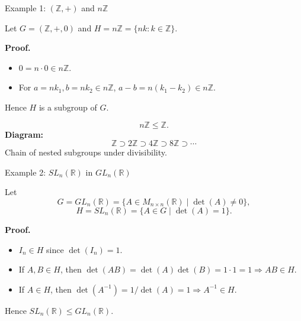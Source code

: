 \begin{frame}{Example 1: $(\mathbb{Z}, +)$ and $n\mathbb{Z}$}
\begin{block}{}
    Let \(G=(\mathbb{Z}, +, 0)\) and \(H = n\mathbb{Z} = \{nk : k\in \mathbb{Z}\}.\)

\textbf{Proof.}
\begin{itemize}
  \item \(0 = n\cdot 0 \in n\mathbb{Z}\).
  \item For \(a=nk_1, b=nk_2 \in n\mathbb{Z}\), \(a-b = n(k_1-k_2)\in n\mathbb{Z}\).
\end{itemize}
Hence \(H\) is a subgroup of \(G.\)

\[
n\mathbb{Z} \le \mathbb{Z}.
\]
\textbf{Diagram:}
\[
\mathbb{Z} \supset 2\mathbb{Z} \supset 4\mathbb{Z} \supset 8\mathbb{Z} \supset \cdots
\]
Chain of nested subgroups under divisibility.
\end{block}

\end{frame}

\begin{frame}{Example 2: $SL_n(\mathbb{R})$ in $GL_n(\mathbb{R})$}
\begin{block}{}
Let
\[
G = GL_n(\mathbb{R}) = \{A\in M_{n\times n}(\mathbb{R}) \mid \det(A)\ne 0\},
\]
\[
H = SL_n(\mathbb{R}) = \{A\in G \mid \det(A)=1\}.
\]

\textbf{Proof.}
\begin{itemize}
  \item \(I_n \in H\) since \(\det(I_n)=1.\)
  \item If \(A,B \in H\), then \(\det(AB)=\det(A)\det(B)=1\cdot1=1 \Rightarrow AB\in H.\)
  \item If \(A\in H\), then \(\det(A^{-1}) = 1/\det(A) = 1 \Rightarrow A^{-1}\in H.\)
\end{itemize}

Hence \(SL_n(\mathbb{R}) \le GL_n(\mathbb{R})\).
\end{block}
\end{frame}

